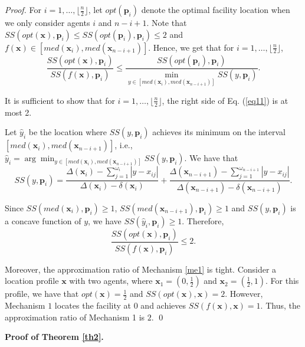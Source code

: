 \documentclass[runningheads]{11llncst}
\begin{document}
\begin{proof}
	For $i=1,\dots,\lfloor\frac{n}{2}\rfloor$, let $opt(\textbf{p}_i)$ denote the optimal facility location when we only consider  agents $i$ and $n-i+1$.  Note that $SS(opt(\textbf{x}), \textbf{p}_i) \leq SS(opt(\textbf{p}_i),\textbf{p}_i) \leq2$ and $f(\textbf{x})\in  [med(\textbf{x}_i),med( \textbf{x}_{n-i+1})]$. Hence, we get that for $i=1,\dots,\lfloor\frac{n}{2}\rfloor$, 
    \begin{equation}\label{eq11}
        \frac{SS(opt(\textbf{x}), \textbf{p}_i)}{SS(f(\textbf{x}), \textbf{p}_i)}\leq \frac{SS(opt(\textbf{p}_i), \textbf{p}_i)}{\min_{y\in[med(\textbf{x}_i),med( \textbf{x}_{n-i+1})]}SS(y, \textbf{p}_i)}.
    \end{equation}
	
	It is sufficient to show that for  $i=1,\dots,\lfloor\frac{n}{2}\rfloor$, the right side of Eq. (\ref{eq11}) is at most 2.
	
	Let $\hat{y}_i$ be the location where  $SS(y, \textbf{p}_i)$ achieves its minimum on the interval $[med(\textbf{x}_i),med( \textbf{x}_{n-i+1})]$, i.e., $\hat{y}_i= \arg \min_{y\in [med(\textbf{x}_i),med( \textbf{x}_{n-i+1})]}{SS(y, \textbf{p}_i)}$. We have that $$SS(y,\textbf{p}_i)=\frac{\Delta(\textbf{x}_i)-\sum_{j=1}^{\omega_i} |y-x_{ij}|}{\Delta(\textbf{x}_i)-\delta(\textbf{x}_i)}+\frac{\Delta(\textbf{x}_{n-i+1})-\sum_{j=1}^{\omega_{n-i+1}} |y-x_{ij}|}{\Delta(\textbf{x}_{n-i+1})-\delta(\textbf{x}_{n-i+1})}.$$
    
     
   Since  $SS(med(\textbf{x}_i),\textbf{p}_i)\geq1$, $SS(med(\textbf{x}_{n-i+1}),\textbf{p}_i)\geq1$ and $SS(y, \textbf{p}_i)$ is a concave function  of $y$, we have $SS(\hat{y}_i, \textbf{p}_i)\geq 1$. Therefore, $$\frac{SS(opt(\textbf{x}), \textbf{p}_i)}{SS(f(\textbf{x}), \textbf{p}_i)} \leq 2.$$
    
	Moreover, the approximation ratio of Mechanism \ref{me1} is tight. Consider a location profile $\textbf{x}$ with two agents, where  $\textbf{x}_1=(0,\frac{1}{2})$ and $\textbf{x}_2=(\frac{1}{2},1)$. For this profile, we have that $opt(\textbf{x})=\frac{1}{2}$ and $SS(opt(\textbf{x}),\textbf{x})=2$. However, Mechanism $1$ locates the facility at $0$ and achieves $SS(f(\textbf{x}),\textbf{x})=1$. Thus, the approximation ratio of Mechanism 1 is $2$. \qed
\end{proof}

\noindent
\textbf{Proof of Theorem \ref{th2}.}
\end{document}
